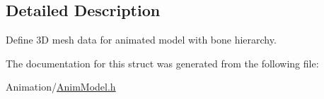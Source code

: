 \subsection{Detailed Description}
Define 3D mesh data for animated model with bone hierarchy. 

The documentation for this struct was generated from the following file\+:\begin{DoxyCompactItemize}
\item 
Animation/\hyperlink{AnimModel_8h}{Anim\+Model.\+h}\end{DoxyCompactItemize}
